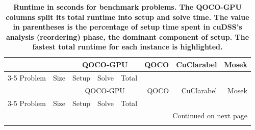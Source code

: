 {\footnotesize
\begin{longtable}{l r *{3}{r} r r r}
\caption{\bf Runtime in seconds for benchmark problems. The QOCO-GPU columns split its total runtime into setup and solve time. The value in parentheses is the percentage of setup time spent in cuDSS's analysis (reordering) phase, the dominant component of setup. The fastest total runtime for each instance is highlighted.}
\label{tab:solver_benchmarks} \\

\toprule
 & & \multicolumn{3}{c}{QOCO-GPU} & QOCO & CuClarabel & Mosek \\
\cmidrule(lr){3-5}
Problem & Size & Setup & Solve & Total & & & \\
\midrule
\endfirsthead

\toprule
 & & \multicolumn{3}{c}{QOCO-GPU} & QOCO & CuClarabel & Mosek \\
\cmidrule(lr){3-5}
Problem & Size & Setup & Solve & Total & & & \\
\midrule
\endhead

\midrule
\multicolumn{8}{r}{\footnotesize Continued on next page} \\
\endfoot


\end{longtable}}
